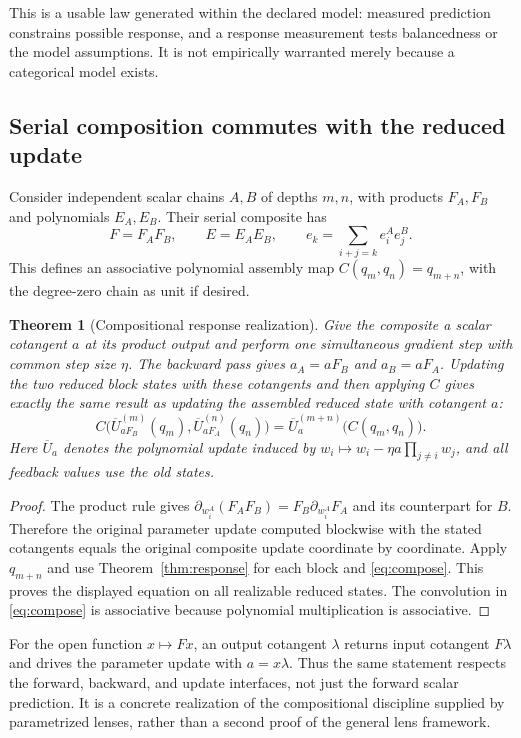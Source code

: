 \documentclass[11pt]{article}
\newtheorem{theorem}{Theorem}[section]
\theoremstyle{definition}\newtheorem{definition}[theorem]{Definition}
\theoremstyle{remark}\newtheorem{remark}[theorem]{Remark}
\begin{document}
This is a usable law generated within the declared model: measured prediction constrains possible response, and a response measurement tests balancedness or the model assumptions. It is not empirically warranted merely because a categorical model exists.

\subsection{Serial composition commutes with the reduced update}
Consider independent scalar chains $A,B$ of depths $m,n$, with products $F_A,F_B$ and polynomials $E_A,E_B$. Their serial composite has
\begin{equation}\label{eq:compose}
 F=F_AF_B,\qquad E=E_AE_B,\qquad
 e_k=\sum_{i+j=k}e_i^Ae_j^B.
\end{equation}
This defines an associative polynomial assembly map $C(q_m,q_n)=q_{m+n}$, with the degree-zero chain as unit if desired.

\begin{theorem}[Compositional response realization]\label{thm:composition}
Give the composite a scalar cotangent $a$ at its product output and perform one simultaneous gradient step with common step size $\eta$. The backward pass gives $a_A=aF_B$ and $a_B=aF_A$. Updating the two reduced block states with these cotangents and then applying $C$ gives exactly the same result as updating the assembled reduced state with cotangent $a$:
\[
 C\bigl(\overline U^{(m)}_{aF_B}(q_m),
        \overline U^{(n)}_{aF_A}(q_n)\bigr)
 =\overline U^{(m+n)}_a\bigl(C(q_m,q_n)\bigr).
\]
Here $\overline U_a$ denotes the polynomial update induced by $w_i\mapsto w_i-\eta a\prod_{j\ne i}w_j$, and all feedback values use the old states.
\end{theorem}
\begin{proof}
The product rule gives $\partial_{w_i^A}(F_AF_B)=F_B\partial_{w_i^A}F_A$ and its counterpart for $B$. Therefore the original parameter update computed blockwise with the stated cotangents equals the original composite update coordinate by coordinate. Apply $q_{m+n}$ and use Theorem~\ref{thm:response} for each block and \eqref{eq:compose}. This proves the displayed equation on all realizable reduced states. The convolution in \eqref{eq:compose} is associative because polynomial multiplication is associative.
\end{proof}

For the open function $x\mapsto Fx$, an output cotangent $\lambda$ returns input cotangent $F\lambda$ and drives the parameter update with $a=x\lambda$. Thus the same statement respects the forward, backward, and update interfaces, not just the forward scalar prediction. It is a concrete realization of the compositional discipline supplied by parametrized lenses, rather than a second proof of the general lens framework.
\end{document}
